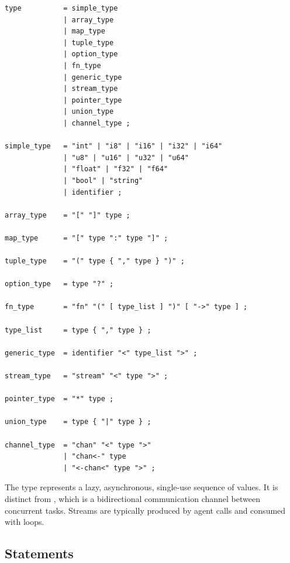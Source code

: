 \begin{lstlisting}[language=EBNF]
type          = simple_type
              | array_type
              | map_type
              | tuple_type
              | option_type
              | fn_type
              | generic_type
              | stream_type
              | pointer_type
              | union_type
              | channel_type ;

simple_type   = "int" | "i8" | "i16" | "i32" | "i64"
              | "u8" | "u16" | "u32" | "u64"
              | "float" | "f32" | "f64"
              | "bool" | "string"
              | identifier ;

array_type    = "[" "]" type ;

map_type      = "[" type ":" type "]" ;

tuple_type    = "(" type { "," type } ")" ;

option_type   = type "?" ;

fn_type       = "fn" "(" [ type_list ] ")" [ "->" type ] ;

type_list     = type { "," type } ;

generic_type  = identifier "<" type_list ">" ;

stream_type   = "stream" "<" type ">" ;

pointer_type  = "*" type ;

union_type    = type { "|" type } ;

channel_type  = "chan" "<" type ">"
              | "chan<-" type
              | "<-chan<" type ">" ;
\end{lstlisting}

\begin{note}
The  type represents a lazy, asynchronous, single-use sequence of values. It is distinct from , which is a bidirectional communication channel between concurrent tasks. Streams are typically produced by agent  calls and consumed with  loops.
\end{note}

\subsection{Statements}

